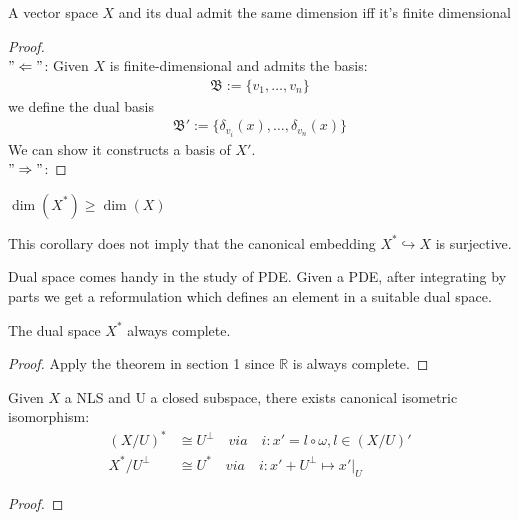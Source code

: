 \begin{proposition}
	A vector space $X$ and its dual admit the same dimension iff it's finite dimensional
\end{proposition}
\begin{proof}
	\quad\\
	$"\Leftarrow"$: Given $X$ is finite-dimensional and admits the basis:
	\begin{align*}
		\mathfrak{B}:= \{v_1, \dots, v_n\}
	\end{align*}
	we define the dual basis
	\begin{align*}
		\mathfrak{B}':= \{\delta_{v_i}(x), \dots, \delta_{v_n}(x)\}
	\end{align*}
	We can show it constructs a basis of $X'$.\\
	$"\Rightarrow"$: 
\end{proof}
\begin{corollary}
	$\dim(X^*) \geq \dim(X)$
\end{corollary}
\begin{remark}
This corollary does not imply that the canonical embedding $X^* \hookrightarrow X$ is surjective. 	
\end{remark}


\begin{example}
	Dual space comes handy in the study of PDE. Given a PDE, after integrating by parts we get a reformulation which defines an element in a suitable dual space.
\end{example}

\begin{theorem}
	The dual space $X^*$ always complete.
\end{theorem}
\begin{proof}
	Apply the theorem in section 1 since $\mathbb{R}$ is always complete.
\end{proof}

\begin{theorem}
	Given $X$ a NLS and U a closed subspace, there exists canonical isometric isomorphism:
	\begin{align*}
		(X\slash U)^* &\cong U^\perp \quad via \quad i: x' = l \circ \omega, l \in (X\slash U)'  \\
		 X^* \slash U^\perp &\cong U^* \quad via \quad i: x' + U^\perp \mapsto x'|_U 
	\end{align*}
\end{theorem}
\begin{proof}
\end{proof}



